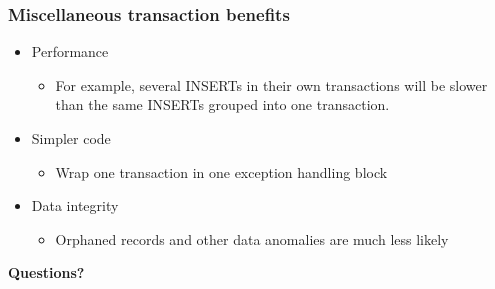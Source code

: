 \documentclass[svgnames]{beamer}
\begin{document}
\begin{frame}
    \frametitle{Miscellaneous transaction benefits}
    \begin{itemize}
        \item Performance
        \begin{itemize}
            \item For example, several INSERTs in their own transactions will
            be slower than the same INSERTs grouped into one transaction.
        \end{itemize}
        \item Simpler code
        \begin{itemize}
            \item Wrap one transaction in one exception handling block
        \end{itemize}
        \item Data integrity
        \begin{itemize}
            \item Orphaned records and other data anomalies are much less likely
        \end{itemize}
    \end{itemize}
\end{frame}

\begin{frame}
    \begin{centering}
        \textbf{Questions?} \par
    \end{centering}
\end{frame}


\end{document}
